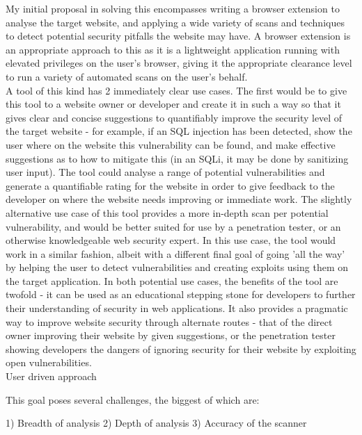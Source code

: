 My initial proposal in solving this encompasses writing a browser extension to analyse the target website, and applying a wide variety of scans and techniques to detect potential security pitfalls the website may have.
A browser extension is an appropriate approach to this as it is a lightweight application running with elevated privileges on the user's browser, giving it the appropriate clearance level to run a variety of automated scans on the user's behalf.  \\


A tool of this kind has 2 immediately clear use cases. 
The first would be to give this tool to a website owner or developer and create it in such a way so that it gives clear and concise suggestions to quantifiably improve the security level of the target website - for example, if an SQL injection has been detected, show the user where on the website this vulnerability can be found, and make effective suggestions as to how to mitigate this (in an SQLi, it may be done by sanitizing user input). The tool could analyse a range of potential vulnerabilities and generate a quantifiable rating for the website in order to give feedback to the developer on where the website needs improving or immediate work.
The slightly alternative use case of this tool provides a more in-depth scan per potential vulnerability, and would be better suited for use by a penetration tester, or an otherwise knowledgeable web security expert. In this use case, the tool would work in a similar fashion, albeit with a different final goal of going 'all the way' by helping the user to detect vulnerabilities and creating exploits using them on the target application. 
In both potential use cases, the benefits of the tool are twofold - it can be used as an educational stepping stone for developers to further their understanding of security in web applications. It also provides a pragmatic way to improve website security through alternate routes - that of the direct owner improving their website by given suggestions, or the penetration tester showing developers the dangers of ignoring security for their website by exploiting open vulnerabilities. \\





User driven approach



This goal poses several challenges, the biggest of which are:

1) Breadth of analysis
2) Depth of analysis
3) Accuracy of the scanner


